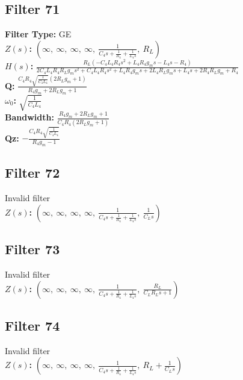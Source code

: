 \documentclass{article}
\begin{document}
\subsection*{Filter 71}
\textbf{Filter Type:} GE \\ 
\textbf{$Z(s)$:} $\left( \infty, \  \infty, \  \infty, \  \infty, \  \frac{1}{C_{4} s + \frac{1}{R_{4}} + \frac{1}{L_{4} s}}, \  R_{L}\right)$ \\ 
\textbf{$H(s)$:} $\frac{R_{L} \left(- C_{4} L_{4} R_{4} s^{2} + L_{4} R_{4} g_{m} s - L_{4} s - R_{4}\right)}{2 C_{4} L_{4} R_{4} R_{L} g_{m} s^{2} + C_{4} L_{4} R_{4} s^{2} + L_{4} R_{4} g_{m} s + 2 L_{4} R_{L} g_{m} s + L_{4} s + 2 R_{4} R_{L} g_{m} + R_{4}}$ \\ 
\textbf{Q:} $\frac{C_{4} R_{4} \sqrt{\frac{1}{C_{4} L_{4}}} \left(2 R_{L} g_{m} + 1\right)}{R_{4} g_{m} + 2 R_{L} g_{m} + 1}$ \\ 
\textbf{$\omega_0$:} $\sqrt{\frac{1}{C_{4} L_{4}}}$ \\ 
\textbf{Bandwidth:} $\frac{R_{4} g_{m} + 2 R_{L} g_{m} + 1}{C_{4} R_{4} \left(2 R_{L} g_{m} + 1\right)}$ \\ 
\textbf{Qz:} $- \frac{C_{4} R_{4} \sqrt{\frac{1}{C_{4} L_{4}}}}{R_{4} g_{m} - 1}$ \\ 
\subsection*{Filter 72}
Invalid filter \\ 
\textbf{$Z(s)$:} $\left( \infty, \  \infty, \  \infty, \  \infty, \  \frac{1}{C_{4} s + \frac{1}{R_{4}} + \frac{1}{L_{4} s}}, \  \frac{1}{C_{L} s}\right)$ \\ 
\subsection*{Filter 73}
Invalid filter \\ 
\textbf{$Z(s)$:} $\left( \infty, \  \infty, \  \infty, \  \infty, \  \frac{1}{C_{4} s + \frac{1}{R_{4}} + \frac{1}{L_{4} s}}, \  \frac{R_{L}}{C_{L} R_{L} s + 1}\right)$ \\ 
\subsection*{Filter 74}
Invalid filter \\ 
\textbf{$Z(s)$:} $\left( \infty, \  \infty, \  \infty, \  \infty, \  \frac{1}{C_{4} s + \frac{1}{R_{4}} + \frac{1}{L_{4} s}}, \  R_{L} + \frac{1}{C_{L} s}\right)$ \\ 
\end{document}
